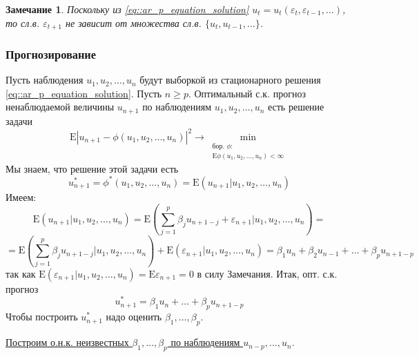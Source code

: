 \documentclass[12pt]{article}
\newtheorem*{remark*}{Замечание}
\def\eps{ \varepsilon }
\def\E{ \mathrm{E} }
\begin{document}
\begin{remark*}
    Поскольку из \eqref{eq::ar_p_equation_solution} $u_t=u_t(\eps_t,\eps_{t-1},\ldots)$,
    то сл.в. $\eps_{t+1}$ не зависит от множества сл.в. $\{u_t,u_{t-1},\ldots\}$.
\end{remark*}
\subsubsection*{Прогнозирование}
Пусть наблюдения $u_1,u_2,\ldots,u_n$ будут выборкой из стационарного решения \eqref{eq::ar_p_equation_solution}.
Пусть $n\geq p$. Оптимальный с.к. прогноз ненаблюдаемой величины $u_{n+1}$ по наблюдениям
$u_1,u_2,\ldots,u_n$ есть решение задачи
\[\E\left\lvert u_{n+1}-\phi(u_1,u_2,\ldots,u_n)\right\rvert ^2\rightarrow\min_{\substack{\text{бор. }\phi: \\ \E\phi(u_1,u_2,\ldots,u_n)<\infty}}\]
Мы знаем, что решение этой задачи есть
\[u_{n+1}^*=\phi^*(u_1,u_2,\ldots,u_n)=\E(u_{n+1}|u_1,u_2,\ldots,u_n)\]
Имеем:
\[\E(u_{n+1}|u_1,u_2,\ldots,u_n)=\E\left(\sum_{j=1}^p\beta_ju_{n+1-j}+\eps_{n+1}\vert u_1,u_2,\ldots,u_n\right)=\]
\[=\E\left(\sum_{j=1}^p\beta_ju_{n+1-j}\vert u_1,u_2,\ldots,u_n\right)+\E\left(\eps_{n+1}\vert u_1,u_2,\ldots,u_n\right)=\beta_1u_n+\beta_2u_{n-1}+\ldots+\beta_pu_{n+1-p}\]
так как $\E\left(\eps_{n+1}\vert u_1,u_2,\ldots,u_n\right)=\E\eps_{n+1}=0$ в силу Замечания. Итак, опт. с.к. прогноз
\[
    \boxed{u^*_{n+1}=\beta_1u_n+\ldots+\beta_pu_{n+1-p}}
\]
Чтобы построить $u^*_{n+1}$ надо оценить $\beta_1,\ldots,\beta_p$.

\underline{Построим о.н.к. неизвестных $\beta_1,\ldots,\beta_p$ по наблюдениям $u_{n-p},\ldots,u_n$}.
\end{document}
